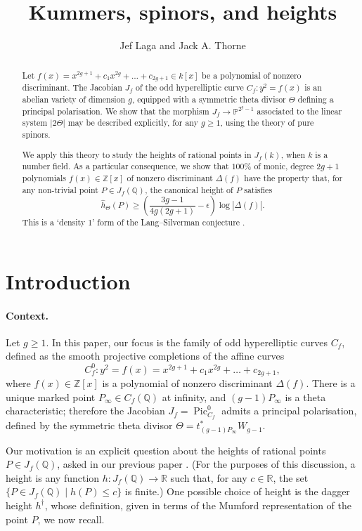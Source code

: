 \documentclass{article} %
\title{Kummers, spinors, and heights}
\author{Jef Laga and Jack A. Thorne}
\numberwithin{equation}{section}
\DeclareMathOperator{\Pic}{Pic}
\renewcommand{\P}{\mathbb{P}}
\newcommand{\R}{\mathbb{R}}
\newcommand{\Q}{\mathbb{Q}}
\newcommand{\Z}{\mathbb{Z}}
\begin{document}
\maketitle

\begin{abstract}
Let $f(x) = x^{2g+1} + c_1 x^{2g} + \dots + c_{2g+1} \in k[x]$ be a polynomial of nonzero discriminant. The Jacobian $J_f$ of the odd hyperelliptic curve $C_f : y^2 = f(x)$ is an abelian variety of dimension $g$, equipped with a symmetric theta divisor $\Theta$ defining a principal polarisation. 
We show that the morphism $J_f \to \P^{2^g-1}$ associated to the linear system $|2 \Theta|$ may be described explicitly, for any $g \geq 1$, using the theory of pure spinors. 

We apply this theory to study the heights of rational points in $J_f(k)$, when $k$ is a number field. As a particular consequence, we show that $100\%$ of monic, degree $2g+1$ polynomials $f(x) \in \Z[x]$ of nonzero discriminant $\Delta(f)$ have the property that, for any non-trivial point $P \in J_f(\Q)$, the canonical height of $P$ satisfies
\[ \widehat{h}_\Theta(P) \geq \left(\frac{3g-1}{4g(2g+1)} - \epsilon\right) \log | \Delta(f) |. \]
This is a `density 1' form of the Lang--Silverman conjecture \cite{Sil84}.
\end{abstract}

\tableofcontents



\section{Introduction}

\paragraph{Context.} Let $g \geq 1$. In this paper, our focus is the family of odd hyperelliptic curves $C_f$, defined as the smooth projective completions of the affine curves
\[ C_f^0 : y^2 = f(x) = x^{2g+1} + c_1 x^{2g} + \dots + c_{2g+1}, \]
where $f(x) \in \Z[x]$ is a polynomial of nonzero discriminant $\Delta(f)$. There is a unique marked point $P_\infty \in C_f(\Q)$ at infinity, and $(g-1)P_\infty$ is a theta characteristic; therefore the  Jacobian $J_f = \Pic^0_{C_f}$ admits a principal polarisation, defined by the symmetric theta divisor $\Theta = t_{(g-1)P_\infty}^\ast W_{g-1}$.

Our motivation is an explicit question about the heights of rational points $P \in J_f(\Q)$, asked in our previous paper \cite{lagathorne2024smallheightoddhyperelliptic}. (For the purposes of this discussion, a height is any function $h : J_f(\Q) \to \R$ such that, for any $c \in \R$, the set $\{ P \in J_f(\Q) \mid h(P) \leq c \}$ is finite.) One possible choice of height is the dagger height $h^\dagger$, whose definition, given in terms of the Mumford representation of the point $P$, we now recall. 
\end{document}
